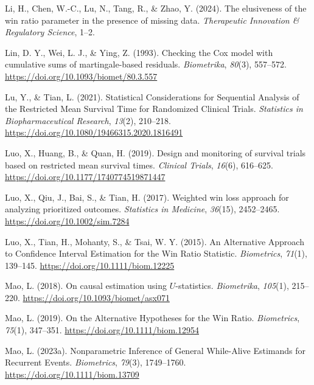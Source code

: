 \documentclass[
  letterpaper,
  DIV=11,
  numbers=noendperiod]{scrreprt}
\newlength{\cslhangindent}
\newlength{\cslentryspacingunit} %
\newenvironment{CSLReferences}[2] %
 {%
  \setlength{\parindent}{0pt}
  \ifodd #1
  \let\oldpar\par
  \def\par{\hangindent=\cslhangindent\oldpar}
  \fi
  \setlength{\parskip}{#2\cslentryspacingunit}
 }%
 {}
\begin{document}
\begin{CSLReferences}{1}{0}
\leavevmode{}%
Li, H., Chen, W.-C., Lu, N., Tang, R., \& Zhao, Y. (2024). The
elusiveness of the win ratio parameter in the presence of missing data.
\emph{Therapeutic Innovation \& Regulatory Science}, 1--2.

\leavevmode{}%
Lin, D. Y., Wei, L. J., \& Ying, Z. (1993). Checking the Cox model with
cumulative sums of martingale-based residuals. \emph{Biometrika},
\emph{80}(3), 557--572. \url{https://doi.org/10.1093/biomet/80.3.557}

\leavevmode{}%
Lu, Y., \& Tian, L. (2021). Statistical Considerations for Sequential
Analysis of the Restricted Mean Survival Time for Randomized Clinical
Trials. \emph{Statistics in Biopharmaceutical Research}, \emph{13}(2),
210--218. \url{https://doi.org/10.1080/19466315.2020.1816491}

\leavevmode{}%
Luo, X., Huang, B., \& Quan, H. (2019). Design and monitoring of
survival trials based on restricted mean survival times. \emph{Clinical
Trials}, \emph{16}(6), 616--625.
\url{https://doi.org/10.1177/1740774519871447}

\leavevmode{}%
Luo, X., Qiu, J., Bai, S., \& Tian, H. (2017). Weighted win loss
approach for analyzing prioritized outcomes. \emph{Statistics in
Medicine}, \emph{36}(15), 2452--2465.
\url{https://doi.org/10.1002/sim.7284}

\leavevmode{}%
Luo, X., Tian, H., Mohanty, S., \& Tsai, W. Y. (2015). An Alternative
Approach to Confidence Interval Estimation for the Win Ratio Statistic.
\emph{Biometrics}, \emph{71}(1), 139--145.
\url{https://doi.org/10.1111/biom.12225}

\leavevmode{}%
Mao, L. (2018). On causal estimation using \(U\)-statistics.
\emph{Biometrika}, \emph{105}(1), 215--220.
\url{https://doi.org/10.1093/biomet/asx071}

\leavevmode{}%
Mao, L. (2019). On the Alternative Hypotheses for the Win Ratio.
\emph{Biometrics}, \emph{75}(1), 347--351.
\url{https://doi.org/10.1111/biom.12954}

\leavevmode{}%
Mao, L. (2023a). Nonparametric Inference of General While-Alive
Estimands for Recurrent Events. \emph{Biometrics}, \emph{79}(3),
1749--1760. \url{https://doi.org/10.1111/biom.13709}


\end{CSLReferences}
\end{document}
